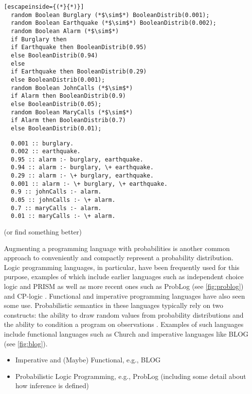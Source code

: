 \begin{lstlisting}[escapeinside={(*}{*)}]
  random Boolean Burglary (*$\sim$*) BooleanDistrib(0.001);
  random Boolean Earthquake (*$\sim$*) BooleanDistrib(0.002);
  random Boolean Alarm (*$\sim$*)
  if Burglary then
  if Earthquake then BooleanDistrib(0.95)
  else BooleanDistrib(0.94)
  else
  if Earthquake then BooleanDistrib(0.29)
  else BooleanDistrib(0.001);
  random Boolean JohnCalls (*$\sim$*)
  if Alarm then BooleanDistrib(0.9)
  else BooleanDistrib(0.05);
  random Boolean MaryCalls (*$\sim$*)
  if Alarm then BooleanDistrib(0.7)
  else BooleanDistrib(0.01);
\end{lstlisting}

\begin{lstlisting}
  0.001 :: burglary.
  0.002 :: earthquake.
  0.95 :: alarm :- burglary, earthquake.
  0.94 :: alarm :- burglary, \+ earthquake.
  0.29 :: alarm :- \+ burglary, earthquake.
  0.001 :: alarm :- \+ burglary, \+ earthquake.
  0.9 :: johnCalls :- alarm.
  0.05 :: johnCalls :- \+ alarm.
  0.7 :: maryCalls :- alarm.
  0.01 :: maryCalls :- \+ alarm.
\end{lstlisting}

\citep{DBLP:series/synthesis/2016Raedt} (or find something better)

Augmenting a programming language with probabilities is another common approach
to conveniently and compactly represent a probability distribution. Logic
programming languages, in particular, have been frequently used for this
purpose, examples of which include earlier languages such as independent choice
logic \citep{DBLP:journals/ai/Poole97} and PRISM \citep{DBLP:conf/ijcai/SatoK97}
as well as more recent ones such as ProbLog \citep{DBLP:conf/ijcai/RaedtKT07}
(see \cref{fig:problog}) and CP-logic \citep{DBLP:journals/tplp/VennekensDB09}.
Functional and imperative programming languages have also seen some use.
Probabilistic semantics in these languages typically rely on two constructs: the
ability to draw random values from probability distributions and the ability to
condition a program on observations \citep{DBLP:conf/icse/GordonHNR14}. Examples
of such languages include functional languages such as Church
\citep{DBLP:conf/uai/GoodmanMRBT08} and imperative languages like BLOG
\citep{DBLP:conf/ijcai/MilchMRSOK05} (see \cref{fig:blog}).

\begin{itemize}
\item Imperative and (Maybe) Functional, e.g., BLOG
\item Probabilistic Logic Programming, e.g., ProbLog \citep{DBLP:conf/ijcai/RaedtKT07} (including some detail about how inference is defined)
\end{itemize}

